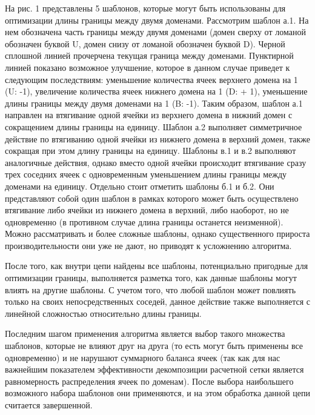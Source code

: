На рис. 1 представлены 5 шаблонов, которые могут быть использованы для оптимизации длины границы между двумя доменами.
Рассмотрим шаблон а.1.
На нем обозначена часть границы между двумя доменами (домен сверху от ломаной обозначен буквой U,  домен снизу от ломаной обозначен буквой D).
Черной сплошной линией прочерчена текущая граница между доменами. Пунктирной линией показано возможное улучшение, которое в данном случае приведет к следующим последствиям: уменьшение количества ячеек верхнего домена на 1 (U: -1), увеличение количества ячеек нижнего домена на 1 (D: + 1), уменьшение длины границы между двумя доменами на 1 (B: -1).
Таким образом, шаблон а.1 направлен на втягивание одной ячейки из верхнего домена в нижний домен с сокращением длины границы на единицу.
Шаблон а.2 выполняет симметричное действие по втягиванию одной ячейки из нижнего домена в верхний домен, также сокращая при этом длину границы на единицу.
Шаблоны в.1 и в.2 выполняют аналогичные действия, однако вместо одной ячейки происходит втягивание сразу трех соседних ячеек с одновременным уменьшением длины границы между доменами на единицу. Отдельно стоит отметить шаблоны б.1 и б.2.
Они представляют собой один шаблон в рамках которого может быть осуществлено втягивание либо ячейки из нижнего домена в верхний, либо наоборот, но не одновременно (в противном случае длина границы останется неизменной).
Можно рассматривать и более сложные шаблоны, однако существенного прироста производительности они уже не дают, но приводят к усложнению алгоритма.

После того, как внутри цепи найдены все шаблоны, потенциально пригодные для оптимизации границы, выполняется разметка того, как данные шаблоны могут влиять на другие шаблоны.
С учетом того, что любой шаблон может повлиять только на своих непосредственных соседей, данное действие также выполняется с линейной сложностью относительно длины границы.

Последним шагом применения алгоритма является выбор такого множества шаблонов, которые не влияют друг на друга (то есть могут быть применены все одновременно) и не нарушают суммарного баланса ячеек (так как для нас важнейшим показателем эффективности декомпозиции расчетной сетки является равномерность распределения ячеек по доменам).
После выбора наибольшего возможного набора шаблонов они применяются, и на этом обработка данной цепи считается завершенной.

